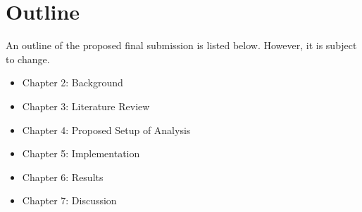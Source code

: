 \section{Outline}
\label{sec:Outline}
An outline of the proposed final submission is listed below. However, it is subject to change.

\begin{itemize}
  \item Chapter 2: Background 
  \item Chapter 3: Literature Review
  \item Chapter 4: Proposed Setup of Analysis
  \item Chapter 5: Implementation
  \item Chapter 6: Results
  \item Chapter 7: Discussion
\end{itemize}





